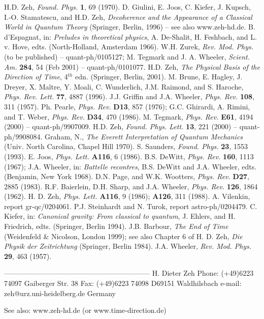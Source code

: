\begin{thebibliography}{99}
    H.D. Zeh, {\it Found. Phys.} {\bf 1}, 69 (1970).
    D. Giulini, E. Joos, C. Kiefer, J. Kupsch, I.-O. Stamatescu, and
H.D. Zeh, {\it Decoherence and the Appearance of a Classical World in
Quantum Theory} (Springer, Berlin, 1996) -- see also www.zeh-hd.de.
B. d'Espagnat,
in: {\it Preludes in theoretical physics}, A. De-Shalit,
H. Feshbach, and L. v. Hove, edts. (North-Holland,
Amsterdam 1966).
W.H. Zurek,
{\it Rev. Mod. Phys.} (to be published) -- quant-ph/0105127;
M. Tegmark and J. A. Wheeler, {\it Scient. Am.} {\bf 284}, 54 (Feb
2001) -- quant-ph/0101077.
    H.D. Zeh, {\em The Physical Basis of the Direction of Time},
4$^{th}$ edn. (Springer, Berlin, 2001).
M. Brune, E. Hagley, J. Dreyer, X. Ma\^itre, Y. Moali, C. Wunderlich,
J.M. Raimond, and S. Haroche, {\it Phys. Rev. Lett.} {\bf 77}, 4887
(1996).
J.J. Griffin and J.A. Wheeler, {\it Phys. Rev.} {\bf 108}, 311 (1957).
Ph. Pearle,
{\it Phys. Rev.} {\bf D13}, 857 (1976); G.C. Ghirardi,
A. Rimini, and T. Weber,
{\it Phys. Rev.} {\bf D34}, 470 (1986).
	  M. Tegmark, {\it Phys. Rev.} {\bf E61}, 4194 (2000) --
quant-ph/9907009.
H.D. Zeh,
{\it Found. Phys. Lett.} {\bf 13}, 221 (2000) -- quant-ph/9908084.
Graham, N., {\it The Everett Interpretation of Quantum
Mechanics}  (Univ. North Carolina, Chapel Hill 1970).
S. Saunders, {\it Found. Phys.} {\bf 23}, 1553 (1993).
E. Joos,
{\it Phys. Lett.}  {\bf A116}, 6 (1986).
B.S. DeWitt, {\it Phys. Rev.} {\bf 160}, 1113 (1967); J.A. Wheeler, in:
{\it Battelle recontres}, B.S. DeWitt and J.A. Wheeler, edts.
(Benjamin, New York 1968).
D.N. Page, and W.K. Wootters, %
{\it Phys. Rev.} {\bf D27}, 2885 (1983).
R.F. Baierlein, D.H. Sharp, and J.A. Wheeler,
{\it Phys. Rev.} {\bf 126}, 1864 (1962).
H. D. Zeh, {\it Phys. Lett.} {\bf A116}, 9 (1986); {\bf A126}, 311
(1988).
A. Vilenkin, report gr-qc/0204061.
P.J. Steinhardt and N. Turok, report astro-ph/0204479.
C. Kiefer,
in: {\it Canonical gravity: From classical to quantum},
J. Ehlers, and H. Friedrich, edts. (Springer, Berlin 1994).
J.B. Barbour, {\it The End of Time} (Weidenfeld \&
Nicolson, London 1999); see also Chapter 6 of H. D. Zeh, {\it Die
Physik der Zeitrichtung} (Springer, Berlin 1984).
J.A. Wheeler, {\it Rev. Mod. Phys.} {\bf 29}, 463 (1957).
\end{thebibliography}


 




--------------------------------------------------------------
H. Dieter Zeh                      Phone: (+49)6223 74097
Gaiberger Str. 38                  Fax:   (+49)6223 74098
D69151 Waldhilsbach         e-mail: zeh@urz.uni-heidelberg.de
Germany

See also:     www.zeh-hd.de     (or www.time-direction.de)

